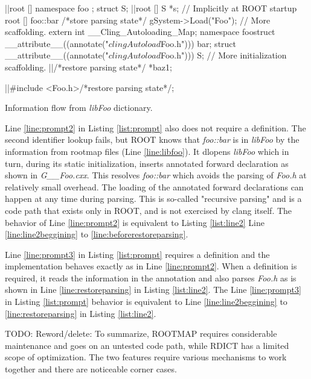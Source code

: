 \documentclass{webofc}
\begin{document}
\begin{listing}[h]
    \noindent
    \begin{minipage}[h]{.7\textwidth}
    \begin{cppcode*}{}
    |\label{line:line2beggining}|root [] namespace foo { }; struct S;
    |\label{line:rootss}|root [] S *s; // Implicitly at ROOT startup
    root [] foo::bar /*store parsing state*/
    gSystem->Load("Foo");
    // More scaffolding.
    extern int __Cling_Autoloading_Map;
    namespace foo{struct __attribute__((annotate("$clingAutoload$Foo.h"))) bar;}
    struct __attribute__((annotate("$clingAutoload$Foo.h"))) S;
    // More initialization scaffolding.
    |\label{line:beforerestoreparsing}|/*restore parsing state*/ *baz1;
    
    |\label{line:restoreparsing}|#include <Foo.h>/*restore parsing state*/;
    \end{cppcode*}
    \end{minipage}
    \caption{Information flow from {\it libFoo} dictionary.}
    \label{list:line2}
\end{listing}

Line \ref{line:prompt2} in Listing \ref{list:prompt} also does not require a definition. The second identifier lookup fails, but ROOT knows that {\it foo::bar} is in {\it libFoo} by the information from rootmap files (Line \ref{line:libfoo}). It dlopens {\it libFoo} which in turn, during its static initialization, inserts annotated forward declaration as shown in {\it G\_\_Foo.cxx}. This resolves {\it foo::bar} which avoids the parsing of {\it Foo.h} at relatively small overhead. The loading of the annotated forward declarations can happen at any time during parsing. This is so-called "recursive parsing" and is a code path that exists only in ROOT, and is not exercised by clang itself. The behavior of Line \ref{line:prompt2} is equivalent to Listing \ref{list:line2} Line \ref{line:line2beggining} to \ref{line:beforerestoreparsing}.

Line \ref{line:prompt3} in Listing \ref{list:prompt} requires a definition and the implementation behaves exactly as in Line \ref{line:prompt2}. When a definition is required, it reads the information in the annotation and also parses {\it Foo.h} as is shown in Line \ref{line:restoreparsing} in Listing \ref{list:line2}. The Line \ref{line:prompt3} in Listing \ref{list:prompt} behavior is equivalent to Line \ref{line:line2beggining} to \ref{line:restoreparsing} in Listing \ref{list:line2}.

TODO: Reword/delete: To summarize, ROOTMAP requires considerable maintenance and goes on an untested code path, while RDICT has a limited scope of optimization. The two features require various mechanisms to work together and there are noticeable corner cases.
\end{document}
